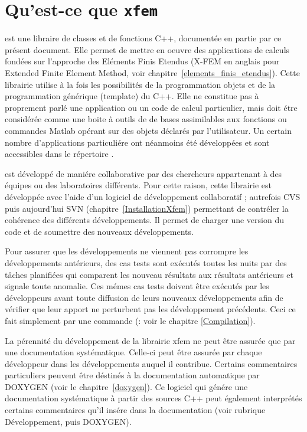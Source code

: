                    
\section*{Qu'est-ce que \texttt{xfem} }\label{IntroGene}

 est une libraire de classes et de fonctions C++, document\'ee en partie par ce
pr\'esent document. Elle permet de mettre en oeuvre des applications
de calculs fond\'ees sur l'approche des El\'ements Finis Etendus (X-FEM en anglais pour Extended Finite Element Method, voir
chapitre~\ref{elements_finis_etendus}). Cette librairie utilise \`a la fois les possibilit\'es de la programmation objets et de la programmation g\'en\'erique (template) du C++. Elle ne constitue
pas \`a proprement parl\'e une application ou un code de calcul
particulier, mais doit \'etre consid\'er\'ee comme une boite \`a outils de
 de bases assimilables aux fonctions ou commandes
Matlab op\'erant sur des objets d\'eclar\'es par l'utilisateur. Un certain nombre d'applications particuli\'ere ont n\'eanmoins \'et\'e d\'evelopp\'ees et sont accessibles dans le r\'epertoire .

  est d\'evelopp\'e de mani\'ere collaborative par des
chercheurs appartenant \`a des \'equipes ou des laboratoires diff\'erents.
Pour cette raison, cette librairie est d\'evelopp\'ee avec l'aide d'un
logiciel de d\'eveloppement collaboratif ; autrefois CVS puis aujourd'hui SVN (chapitre~\ref{InstallationXfem}) permettant de contr\'eler la coh\'erence des diff\'erents
d\'eveloppements. Il permet de charger une version du code  et
de soumettre des nouveaux d\'eveloppements. 
   
Pour assurer que les d\'eveloppements ne viennent pas corrompre les
d\'eveloppements ant\'erieurs, des cas tests sont ex\'ecut\'es toutes les
nuits par des t\^aches planifi\'ees qui comparent les nouveau r\'esultats
aux r\'esultats ant\'erieurs et signale toute anomalie.  Ces m\'emes cas tests
doivent \^etre ex\'ecut\'es par les d\'eveloppeurs avant toute diffusion de
leurs nouveaux d\'eveloppements afin de v\'erifier que leur apport ne perturbent pas les d\'eveloppement pr\'ec\'edents. Ceci ce fait simplement par une commande (: voir le chapitre \ref{Compilation}).

La p\'erennit\'e du d\'eveloppement de la librairie xfem ne peut \^etre assur\'ee que par une
documentation syst\'ematique. Celle-ci peut \^etre assur\'ee par chaque d\'eveloppeur dans les d\'eveloppements auquel il contribue. Certains commentaires particuliers peuvent \^etre d\'estin\'es \`a la documentation automatique par DOXYGEN (voir le chapitre~\ref{doxygen}). Ce logiciel qui g\'en\'ere une documentation syst\'ematique \`a partir des sources C++ peut \'egalement  interpr\'et\'es certains commentaires qu'il ins\'ere dans la documentation (voir  rubrique D\'eveloppement, puis DOXYGEN).


